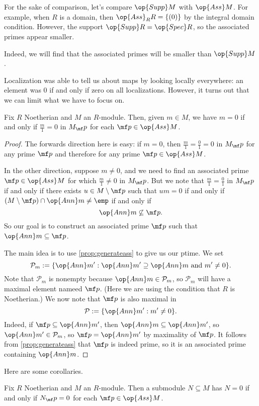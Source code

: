 \begin{remark}
	For the sake of comparison, let's compare $\op{Supp}M$ with $\op{Ass}M$. For example, when $R$ is a domain, then $\op{Ass}_RR=\{(0)\}$ by the integral domain condition. However, the support $\op{Supp}R=\op{Spec}R$, so the associated primes appear smaller.
\end{remark}
Indeed, we will find that the associated primes will be smaller than $\op{Supp}M$.

Localization was able to tell us about maps by looking locally everywhere: an element was $0$ if and only if zero on all localizations. However, it turns out that we can limit what we have to focus on.
\begin{proposition} \label{prop:localassprimes}
	Fix $R$ Noetherian and $M$ an $R$-module. Then, given $m\in M$, we have $m=0$ if and only if $\frac m1=0$ in $M_\mf p$ for each $\mf p\in\op{Ass}M$.
\end{proposition}	
\begin{proof}
	The forwards direction here is easy: if $m=0$, then $\frac m1=\frac01=0$ in $M_\mf p$ for any prime $\mf p$ and therefore for any prime $\mf p\in\op{Ass}M$.

	In the other direction, suppose $m\ne0$, and we need to find an associated prime $\mf p\in\op{Ass}M$ for which $\frac m1\ne0$ in $M_\mf p$. But we note that $\frac m1=\frac01$ in $M_\mf p$ if and only if there exists $u\in M\setminus\mf p$ such that $um=0$ if and only if $(M\setminus\mf p)\cap\op{Ann}m\ne\emp$ if and only if
	\[\op{Ann}m\not\subseteq\mf p.\]
	So our goal is to construct an associated prime $\mf p$ such that $\op{Ann}m\subseteq\mf p$.
	
	The main idea is to use \autoref{prop:generateass} to give us our ptime. We set
	\[\mathcal P_m:=\{\op{Ann}m':\op{Ann}m'\supseteq\op{Ann}m\text{ and }m'\ne0\}.\]
	Note that $\mathcal P_m$ is nonempty because $\op{Ann}m\in\mathcal P_m$, so $\mathcal P_m$ will have a maximal element nameed $\mf p$. (Here we are using the condition that $R$ is Noetherian.) We now note that $\mf p$ is also maximal in
	\[\mathcal P:=\{\op{Ann}m':m'\ne0\}.\]
	Indeed, if $\mf p\subseteq\op{Ann}m'$, then $\op{Ann}m\subseteq\op{Ann}m'$, so $\op{Ann}m'\in\mathcal P_m$, so $\mf p=\op{Ann}m'$ by maximality of $\mf p$. It follows from \autoref{prop:generateass} that $\mf p$ is indeed prime, so it is an associated prime containing $\op{Ann}m$.
\end{proof}
Here are some corollaries.
\begin{corollary} \label{cor:localasssubmod}
	Fix $R$ Noetherian and $M$ an $R$-module. Then a submodule $N\subseteq M$ has $N=0$ if and only if $N_\mf p=0$ for each $\mf p\in\op{Ass}M$.
\end{corollary}
